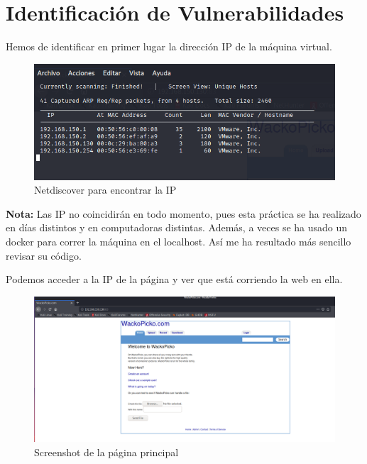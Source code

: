 \documentclass[12pt,twoside]{article}
\begin{document}
\section{Identificación de Vulnerabilidades}
Hemos de identificar en primer lugar la dirección IP de la máquina virtual.
\begin{figure}[H]
    \centering
    \includegraphics[scale=0.7]{./imagenes/netdiscover}
    \caption{Netdiscover para encontrar la IP}
\end{figure}
\textbf{Nota:} Las IP no coincidirán en todo momento, pues esta práctica se ha realizado en días distintos y en computadoras distintas. Además, a veces se ha usado un docker para correr la máquina en el localhost. Así me ha resultado más sencillo revisar su código. 

Podemos acceder a la IP de la página y ver que está corriendo la web en ella.
\begin{figure}[H]
    \centering
    \includegraphics[scale=0.35]{./imagenes/wackopicko}
    \caption{Screenshot de la página principal}
\end{figure}
\end{document}

